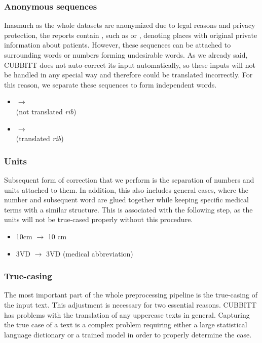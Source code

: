 \subsubsection*{Anonymous sequences}
Inasmuch as the whole datasets are anonymized due to legal reasons and privacy protection, the reports contain , such as  or \qq{\underline{{ }{ }{ }{ }}}, denoting places with original private information about patients. However, these sequences can be attached to surrounding words or numbers forming undesirable words. As we already said, CUBBITT does not auto-correct its input automatically, so these inputs will not be handled in any special way and therefore could be translated incorrectly. For this reason, we separate these sequences to form independent words.

\begin{itemize}
	\item {} $\rightarrow$ \\  (not translated \textit{rib})
	\item {} $\rightarrow$ \\  (translated \textit{rib})
\end{itemize}

\subsubsection*{Units}
Subsequent form of correction that we perform is the separation of numbers and units attached to them. In addition, this also includes general cases, where the number and subsequent word are glued together while keeping specific medical terms with a similar structure. This is associated with the following step, as the units will not be true-cased properly without this procedure.

\begin{itemize}
	\item 10cm $\rightarrow$ 10 cm
	\item 3VD $\rightarrow$ 3VD (medical abbreviation)
\end{itemize}

\subsubsection*{True-casing}
The most important part of the whole preprocessing pipeline is the true-casing of the input text. This adjustment is necessary for two essential reasons. CUBBITT has problems with the translation of any uppercase texts in general. Capturing the true case of a text is a complex problem requiring either a large statistical language dictionary or a trained model in order to properly determine the case.\\

